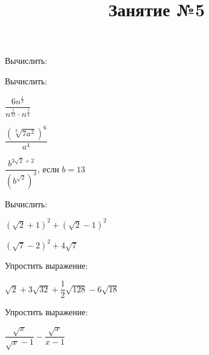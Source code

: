 \title{Занятие №5}
\begin{listofex}
	\item {}
	\item Вычислить:
	\begin{enumcols}[itemcolumns=2]
		\item {}
		\item {}
		\item {}
		\item {}
	\end{enumcols}
	\item Вычислить:
	\begin{enumcols}[itemcolumns=3]
		\item \( \dfrac{6n^{\tfrac{1}{3}}}{n^{\tfrac{1}{12}}\cdot n^{\tfrac{1}{4}}} \) 
		\item \( \dfrac{(\sqrt[3]{7a^2})^6}{a^4} \) 
		\item \( \dfrac{b^{3\sqrt{2}+2}}{(b^{\sqrt{2}})^3} \), если \( b=13 \) 
	\end{enumcols}
	\item Вычислить:
	\begin{enumcols}[itemcolumns=2]
		\item {}
		\item {}
		\item {}
		\item {}
		\item \( (\sqrt{2}+1)^2+(\sqrt{2}-1)^2 \) 
		\item \( (\sqrt{7}-2)^2+4\sqrt{7} \) 
	\end{enumcols}
	\item Упростить выражение:
	\begin{enumcols}[itemcolumns=3]
		\item \( \sqrt{2}+3\sqrt{32}+\dfrac{1}{2}\sqrt{128}-6\sqrt{18} \) 
		\item {}
		\item {}
	\end{enumcols}
	\item Упростить выражение:
	\begin{enumcols}[itemcolumns=3]
		\item \( \dfrac{\sqrt{x}}{\sqrt{x}-1}-\dfrac{\sqrt{x}}{x-1} \) 

\end{enumcols}
\end{listofex}
